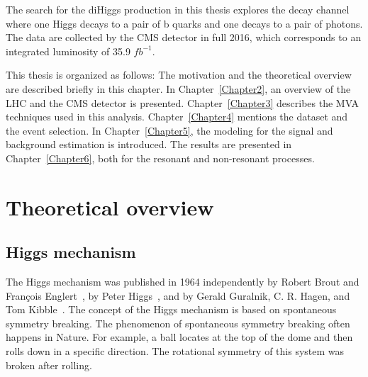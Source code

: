 

The search for the diHiggs production in this thesis explores the decay channel where one Higgs decays to a pair of b quarks and one decays to a pair of photons.
The data are collected by the CMS detector in full 2016, which corresponds to an integrated luminosity of 35.9 $fb^{-1}$.

This thesis is organized as follows:
The motivation and the theoretical overview are described briefly in this chapter.
In Chapter~\ref{Chapter2}, an overview of the LHC and the CMS detector is presented.
Chapter~\ref{Chapter3} describes the MVA techniques used in this analysis.
Chapter~\ref{Chapter4} mentions the dataset and the event selection.
In Chapter~\ref{Chapter5}, the modeling for the signal and background estimation is introduced.
The results are presented in Chapter~\ref{Chapter6}, both for the resonant and non-resonant processes.


\section{Theoretical overview}

\subsection{Higgs mechanism}

The Higgs mechanism was published in 1964 independently by Robert Brout and François Englert~\cite{Englert1964}, by Peter Higgs~\cite{Higgs1964}, and by Gerald Guralnik, C. R. Hagen, and Tom Kibble~\cite{Guralnik1964}.
The concept of the Higgs mechanism is based on spontaneous symmetry breaking.
The phenomenon of spontaneous symmetry breaking often happens in Nature.
For example, a ball locates at the top of the dome and then rolls down in a specific direction.
The rotational symmetry of this system was broken after rolling.


